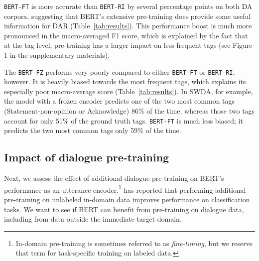 \documentclass[11pt,a4paper]{article}
\begin{document}
\texttt{BERT-FT} is more accurate than \texttt{BERT-RI} by several percentage points on both DA corpora,
suggesting that BERT's extensive pre-training does provide some useful information for DAR (Table~\ref{tab:results}).
This performance boost is much more pronounced in the macro-averaged F1 score,
which is explained by the fact that at the tag level, pre-training has a larger impact on less frequent tags
(see Figure 1 in the supplementary materials).

The \texttt{BERT-FZ} performs very poorly compared to either \texttt{BERT-FT} or \texttt{BERT-RI}, however.
It is heavily biased towards the most frequent tags, which explains its especially poor macro-average score (Table~\ref{tab:results}).
In SWDA, for example, the model with a frozen encoder predicts one of the two most common tags (Statement-non-opinion or Acknowledge) 86\% of the time, whereas those two
tags account for only 51\% of the ground truth tags.
\texttt{BERT-FT} is much less biased; it predicts the two most common tags only 59\% of the time.




\subsection{Impact of dialogue pre-training} \label{sec:experiment3} %

Next, we assess the effect of additional dialogue pre-training on BERT's performance as an utterance encoder.\footnote{
In-domain pre-training is sometimes referred to as \textit{fine-tuning}, but we reserve that term for task-specific training on labeled data.}
\citet{sunHowFineTuneBERT2019} has reported that performing additional pre-training on unlabeled in-domain data improves performance on classification tasks. 
We want to see if BERT can benefit from pre-training on dialogue data, including from data outside the immediate target domain.
\end{document}
